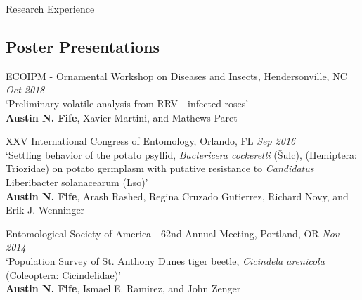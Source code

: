 \documentclass{resume} %
\begin{document}
\begin{rSection}{Research Experience}

\subsection*{Poster Presentations}

ECOIPM - Ornamental Workshop on Diseases and Insects, Hendersonville, NC \hfill {\em \textit{Oct 2018}}\\
`Preliminary volatile analysis from RRV - infected roses'\\
\textbf{Austin N. Fife}, Xavier Martini, and Mathews Paret\\ \hfill

XXV International Congress of Entomology, Orlando, FL  \hfill {\em \textit{Sep 2016}}\\
`Settling behavior of the potato psyllid, \textit{Bactericera cockerelli} (Šulc), (Hemiptera: Triozidae) on potato germplasm with putative resistance to \textit{Candidatus} Liberibacter solanacearum (Lso)'\\
\textbf{Austin N. Fife}, Arash Rashed, Regina Cruzado Gutierrez, Richard Novy, and\\ Erik J. Wenninger \hfill

Entomological Society of America - 62nd Annual Meeting, Portland, OR \hfill {\em \textit{Nov 2014}}\\
`Population Survey of St. Anthony Dunes tiger beetle, \textit{Cicindela arenicola} (Coleoptera: Cicindelidae)'\\
\textbf{Austin N. Fife}, Ismael E. Ramirez, and John Zenger\\ \hfill

\end{rSection}

\newpage

\end{document}
